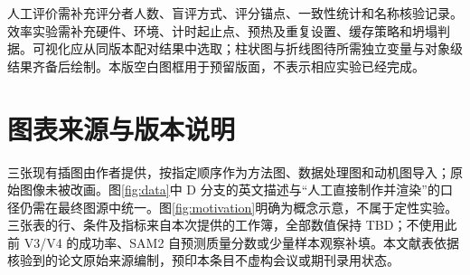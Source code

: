 人工评价需补充评分者人数、盲评方式、评分锚点、一致性统计和名称核验记录。效率实验需补充硬件、环境、计时起止点、预热及重复设置、缓存策略和坍塌判据。可视化应从同版本配对结果中选取；柱状图与折线图待所需独立变量与对象级结果齐备后绘制。本版空白图框用于预留版面，不表示相应实验已经完成。

\section{图表来源与版本说明}
三张现有插图由作者提供，按指定顺序作为方法图、数据处理图和动机图导入；原始图像未被改画。图\ref{fig:data}中 D 分支的英文描述与“人工直接制作并渲染”的口径仍需在最终图源中统一。图\ref{fig:motivation}明确为概念示意，不属于定性实验。三张表的行、条件及指标来自本次提供的工作簿，全部数值保持 TBD；不使用此前 V3/V4 的成功率、SAM2 自预测质量分数或少量样本观察补填。本文献表依据核验到的论文原始来源编制，预印本条目不虚构会议或期刊录用状态。

